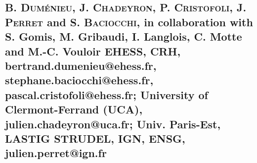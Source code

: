 \documentclass[portrait,a0]{sciposter}
\begin{document}
\vspace{1cm}
\begin{minipage}[b]{\textwidth}
  \setlength{\parindent}{-0em}
  \begin{multicols}{3}
    \section*{\normalfont B. \textsc{Duménieu}, J. \textsc{Chadeyron}, P. \textsc{Cristofoli}, J. \textsc{Perret} and S. \textsc{Baciocchi}, in collaboration with S. Gomis, M. Gribaudi, I. Langlois, C. Motte and M.-C. Vouloir
    \newline
    \noindent \scriptsize {} EHESS, CRH, bertrand.dumenieu@ehess.fr, stephane.baciocchi@ehess.fr, pascal.cristofoli@ehess.fr;  University of Clermont-Ferrand (UCA), julien.chadeyron@uca.fr;  Univ. Paris-Est, LASTIG STRUDEL, IGN, ENSG, julien.perret@ign.fr
    }

\end{multicols}
\end{minipage}
\end{document}
